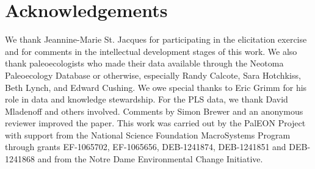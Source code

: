 \documentclass[12pt]{article}
\begin{document}
\section*{Acknowledgements}
We thank Jeannine-Marie St. Jacques for participating in the
elicitation exercise and for comments in the intellectual development
stages of this work. We also thank paleoecologists who made their data
available through the Neotoma Paleoecology Database or otherwise,
especially Randy Calcote, Sara Hotchkiss, Beth Lynch, and Edward
Cushing. We owe special thanks to Eric Grimm for his role in data and
knowledge stewardship. For the PLS data, we thank David Mladenoff and
others involved. Comments by Simon Brewer and an anonymous reviewer
improved the paper. This work was carried out by the PalEON Project
with support from the National Science Foundation MacroSystems Program
through grants EF-1065702, EF-1065656, DEB-1241874, DEB-1241851 and
DEB-1241868 and from the Notre Dame Environmental Change Initiative.

\newpage
\begingroup\doublespacing

\endgroup


%


\newpage
\vspace{2in}
\begin{appendices}
\section{}
\label{append}


\end{appendices}
\end{document}

